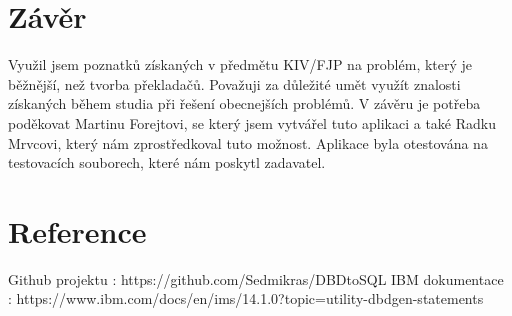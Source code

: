 \section{Závěr}
Využil jsem poznatků získaných v předmětu KIV/FJP na problém, který je běžnější, než tvorba překladačů. Považuji za důležité umět využít znalosti získaných během studia při řešení obecnejších problémů. V závěru je potřeba poděkovat Martinu Forejtovi, se který jsem vytvářel tuto aplikaci a také Radku Mrvcovi, který nám zprostředkoval tuto možnost. Aplikace byla otestována na testovacích souborech, které nám poskytl zadavatel.

\section{Reference}
Github projektu : https://github.com/Sedmikras/DBDtoSQL
IBM dokumentace : https://www.ibm.com/docs/en/ims/14.1.0?topic=utility-dbdgen-statements

\clearpage
